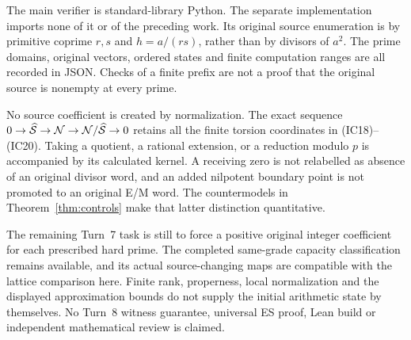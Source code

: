 The main verifier is standard-library Python. The separate implementation imports
none of it or of the preceding work. Its original source enumeration is by
primitive coprime $r,s$ and $h=a/(rs)$, rather than by divisors of $a^2$.
The prime domains, original vectors, ordered states and finite computation
ranges are all recorded in JSON. Checks of a finite prefix are not a proof
that the original source is nonempty at every prime.

No source coefficient is created by normalization. The exact sequence
$0\to\widehat{\mathcal S}\to\mathcal N\to\mathcal N/\widehat{\mathcal S}\to0$ retains all the finite torsion coordinates
in (IC18)--(IC20). Taking a quotient, a rational extension, or a reduction modulo
$p$ is accompanied by its calculated kernel. A receiving zero is not relabelled
as absence of an original divisor word, and an added nilpotent boundary point
is not promoted to an original E/M word. The countermodels in
Theorem~\ref{thm:controls} make that latter distinction quantitative.

The remaining Turn~7 task is still to force a positive original integer
coefficient for each prescribed hard prime. The completed same-grade capacity
classification remains available, and its actual source-changing maps are
compatible with the lattice comparison here. Finite rank, properness, local
normalization and the displayed approximation bounds do not supply the initial
arithmetic state by themselves. No Turn~8 witness guarantee, universal ES
proof, Lean build or independent mathematical review is claimed.

